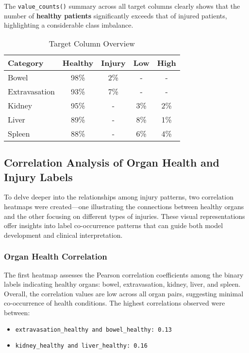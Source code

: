 \documentclass[a4paper,12pt]{article}
\begin{document}
The \verb|value_counts()| summary across all target columns clearly shows that the number of \textbf{healthy patients} significantly exceeds that of injured patients, highlighting a considerable class imbalance.

\begin{table}[!htbp]
    \centering
    
    \vspace{0.2cm}
    \begin{tabular}{|l|c|c|c|c|}
        \hline
        \textbf{Category} & \textbf{Healthy} & \textbf{Injury} & \textbf{Low} & \textbf{High} \\
        \hline
        Bowel & 98\% & 2\% & - & - \\
        Extravasation & 93\% & 7\% & - & - \\
        Kidney & 95\% & - & 3\% & 2\% \\
        Liver & 89\% & - & 8\% & 1\% \\
        Spleen & 88\% & - & 6\% & 4\% \\
        \hline
    
    \end{tabular}
    \label{tab:target_overview}
    \caption{Target Column Overview}
\end{table}


\subsection{Correlation Analysis of Organ Health and Injury Labels}
To delve deeper into the relationships among injury patterns, two correlation heatmaps were created—one illustrating the connections between healthy organs and the other focusing on different types of injuries. These visual representations offer insights into label co-occurrence patterns that can guide both model development and clinical interpretation.

\subsubsection{Organ Health Correlation}
The first heatmap assesses the Pearson correlation coefficients among the binary labels indicating healthy organs: bowel, extravasation, kidney, liver, and spleen. Overall, the correlation values are low across all organ pairs, suggesting minimal co-occurrence of health conditions. 
The highest correlations observed were between:

\begin{itemize}

    \item \verb|extravasation_healthy and bowel_healthy: 0.13|
    \item \verb|kidney_healthy and liver_healthy: 0.16|

\end{itemize}
\end{document}
